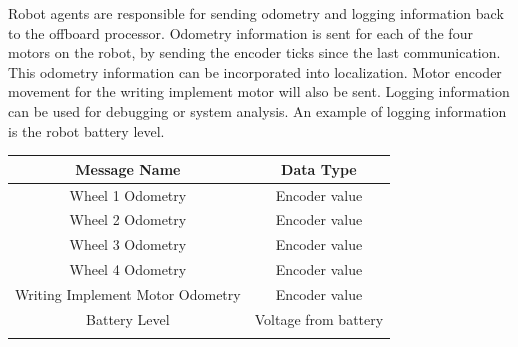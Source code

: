 Robot agents are responsible for sending odometry and logging information back to the offboard processor. Odometry information is sent for each of the four motors on the robot, by sending the encoder ticks since the last communication. This odometry information can be incorporated into localization. Motor encoder movement for the writing implement motor will also be sent. Logging information can be used for debugging or system analysis. An example of logging information is the robot battery level.  \\
\begin{center}
 \begin{tabular}{||c c ||}
 \hline
 Message Name & Data Type \\ [0.5ex]
 \hline\hline
 Wheel 1 Odometry & Encoder value \\
 \hline
 Wheel 2 Odometry & Encoder value \\
 \hline
 Wheel 3 Odometry & Encoder value \\
 \hline
 Wheel 4 Odometry & Encoder value \\
 \hline
 Writing Implement Motor Odometry & Encoder value \\
 \hline
 Battery Level & Voltage from battery \\
 \hline \\ [1ex]
\end{tabular}
\end{center}


